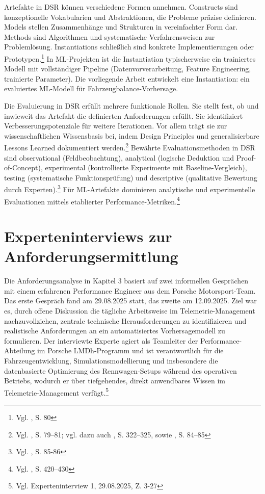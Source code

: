 Artefakte in \ac{DSR} können verschiedene Formen annehmen. Constructs sind konzeptionelle Vokabularien und Abstraktionen, die Probleme präzise definieren. Models stellen Zusammenhänge und Strukturen in vereinfachter Form dar. Methods sind Algorithmen und systematische Verfahrensweisen zur Problemlösung. Instantiations schließlich sind konkrete Implementierungen oder Prototypen.\footnote{Vgl. \cite{Hevner2004}, S. 80} In \ac{ML}-Projekten ist die Instantiation typischerweise ein trainiertes Modell mit vollständiger Pipeline (Datenvorverarbeitung, Feature Engineering, trainierte Parameter). Die vorliegende Arbeit entwickelt eine Instantiation: ein evaluiertes \ac{ML}-Modell für Fahrzeugbalance-Vorhersage.

Die Evaluierung in \ac{DSR} erfüllt mehrere funktionale Rollen. Sie stellt fest, ob und inwieweit das Artefakt die definierten Anforderungen erfüllt. Sie identifiziert Verbesserungspotenziale für weitere Iterationen. Vor allem trägt sie zur wissenschaftlichen Wissensbasis bei, indem Design Principles und generalisierbare Lessons Learned dokumentiert werden.\footnote{Vgl. \cite{Venable2016}, S. 79–81; vgl. dazu auch \cite{Gregor2007}, 
S. 322–325, sowie \cite{Hevner2004}, 
S. 84–85}
 Bewährte Evaluationsmethoden in \ac{DSR} sind observational (Feldbeobachtung), 
analytical (logische Deduktion und Proof-of-Concept), experimental 
(kontrollierte Experimente mit Baseline-Vergleich), testing (systematische 
Funktionsprüfung) und descriptive (qualitative Bewertung durch Experten).\footnote{Vgl. 
\cite{Hevner2004}, S. 85-86} Für \ac{ML}-Artefakte dominieren 
analytische und experimentelle Evaluationen mittels etablierter Performance-Metriken.\footnote{Vgl. \cite{Friedman2009}, S. 420–430}


\section{Experteninterviews zur Anforderungsermittlung}

Die Anforderungsanalyse in Kapitel 3 basiert auf zwei informellen Gesprächen mit einem erfahrenen Performance Engineer aus dem Porsche Motorsport-Team. Das erste Gespräch fand am 29.08.2025 statt, das zweite am 12.09.2025. Ziel war es, durch offene Diskussion die tägliche Arbeitsweise im Telemetrie-Management nachzuvollziehen, zentrale technische Herausforderungen zu identifizieren und realistische Anforderungen an ein automatisiertes Vorhersagemodell zu formulieren.
Der interviewte Experte agiert als Teamleiter der Performance-Abteilung im Porsche LMDh-Programm und ist verantwortlich für die Fahrzeugentwicklung, Simulationsmodellierung und insbesondere die datenbasierte Optimierung des Rennwagen-Setups während des operativen Betriebs, wodurch er über tiefgehendes, direkt anwendbares Wissen im Telemetrie-Management verfügt.\footnote{Vgl. Experteninterview 1, 29.08.2025, Z. 3-27}

